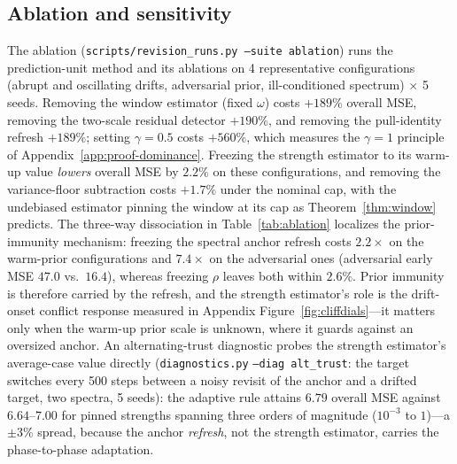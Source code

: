 \subsection{Ablation and sensitivity}
The ablation (\texttt{scripts/revision\_runs.py --suite ablation}) runs the prediction-unit method and its ablations on 4 representative configurations (abrupt and oscillating drifts, adversarial prior, ill-conditioned spectrum) $\times$ 5 seeds.
Removing the window estimator (fixed $\omega$) costs $+189\%$ overall MSE, removing the two-scale residual detector $+190\%$, and removing the pull-identity refresh $+189\%$; setting $\gamma = 0.5$ costs $+560\%$, which measures the $\gamma = 1$ principle of Appendix~\ref{app:proof-dominance}.
Freezing the strength estimator to its warm-up value \emph{lowers} overall MSE by $2.2\%$ on these configurations, and removing the variance-floor subtraction costs $+1.7\%$ under the nominal cap, with the undebiased estimator pinning the window at its cap as Theorem~\ref{thm:window} predicts.
The three-way dissociation in Table~\ref{tab:ablation} localizes the prior-immunity mechanism: freezing the spectral anchor refresh costs $2.2\times$ on the warm-prior configurations and $7.4\times$ on the adversarial ones (adversarial early MSE $47.0$ vs.\ $16.4$), whereas freezing $\rho$ leaves both within $2.6\%$.
Prior immunity is therefore carried by the refresh, and the strength estimator's role is the drift-onset conflict response measured in Appendix Figure~\ref{fig:cliffdials}---it matters only when the warm-up prior scale is unknown, where it guards against an oversized anchor.
An alternating-trust diagnostic probes the strength estimator's average-case value directly (\texttt{diagnostics.py} \texttt{--diag alt\_trust}: the target switches every 500 steps between a noisy revisit of the anchor and a drifted target, two spectra, 5 seeds): the adaptive rule attains $6.79$ overall MSE against $6.64$--$7.00$ for pinned strengths spanning three orders of magnitude ($10^{-3}$ to $1$)---a $\pm 3\%$ spread, because the anchor \emph{refresh}, not the strength estimator, carries the phase-to-phase adaptation.

